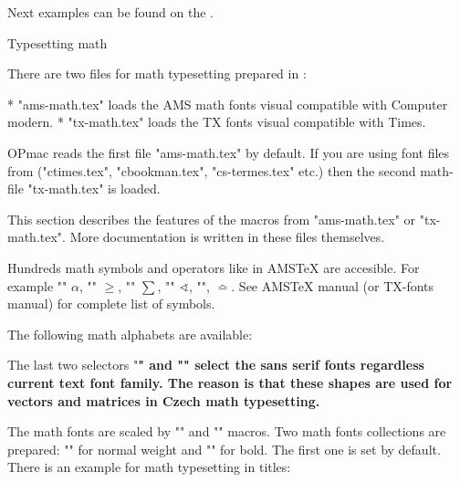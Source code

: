 \begtt
\def\printbib{\hangindent=\parindent \indent \llap{\the\bibnum. }}
\def\printbib{\hangindent=\parindent \noindent [\the\bibmark]\quad}
\endtt 

Next examples can be found on the 
.


\sec Typesetting math

There are two files for math typesetting prepared in \csplain:

\begitems
* "ams-math.tex" loads the AMS math fonts visual compatible with Computer
  modern.
* "tx-math.tex" loads the TX fonts visual compatible with Times.
\enditems

OPmac reads the first file "ams-math.tex" by default. If you are using font
files from \csplain{} ("ctimes.tex", "cbookman.tex", "cs-termes.tex" etc.)
then the second math-file "tx-math.tex" is loaded.

This section describes the features of the macros from "ams-math.tex" or
"tx-math.tex". More documentation is written in these files themselves. 

Hundreds math symbols and operators like in AMS\TeX{} are accesible. 
For example  "\alpha" $\alpha$, "\geq" $\geq$, "\sum" $\sum$, 
"\sphericalangle" $\sphericalangle$, "\bumpeq", $\bumpeq$. See AMS\TeX{}
manual (or TX-fonts manual) for complete list of symbols.

The following math alphabets are available:

{\def\tthook{\catcode`\$=3 \catcode`/=0 \medmuskip=0mu \adef{ }{ }}%
\begtt
\mit     %
\it      %
\rm      %
\cal     %
\script  %
\frak    %
\bbchar  %
\bf      %
\bi      %
\endtt
}

The last two selectors "\bf" and "\bi" select the sans serif fonts regardless
current text font family. The reason is that these shapes are used for
vectors and matrices in Czech math typesetting.

The math fonts are scaled by "\typosize" and "\typoscale" macros.
Two math fonts collections are prepared: "\normalmath" for normal weight
and "\boldmath" for bold. The first one is set by default.
There is an example for math typesetting in titles:

